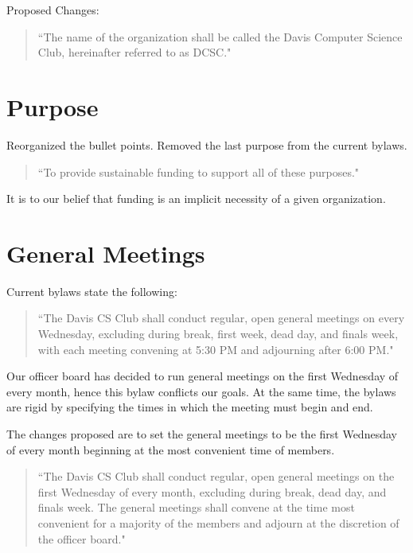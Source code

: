 \documentclass[11pt]{article}
\begin{document}
\noindent Proposed Changes:

\begin{quote}
	``The name of the organization shall be called the Davis Computer Science Club, hereinafter referred to as DCSC."
\end{quote}

\section{Purpose}

Reorganized the bullet points. Removed the last purpose from the current bylaws.

\begin{quote}
``To provide sustainable funding to support all of these purposes."
\end{quote}

\noindent It is to our belief that funding is an implicit necessity of a given organization.

\section{General Meetings}

Current bylaws state the following:

\begin{quote}
	``The Davis CS Club shall conduct regular, open general meetings on every Wednesday, excluding during break, first week, dead day, and finals week, with each meeting convening at 5:30 PM and adjourning after 6:00 PM."
\end{quote}

\noindent Our officer board has decided to run general meetings on the first Wednesday of every month, hence this bylaw conflicts our goals. At the same time, the bylaws are rigid by specifying the times in which the meeting must begin and end.

\noindent The changes proposed are to set the general meetings to be the first Wednesday of every month beginning at the most convenient time of members.

\begin{quote}
``The Davis CS Club shall conduct regular, open general meetings on the first Wednesday of every month, excluding during break, dead day, and finals week. The general meetings shall convene at the time most convenient for a majority of the members and adjourn at the discretion of the officer board."
\end{quote}
\end{document}

